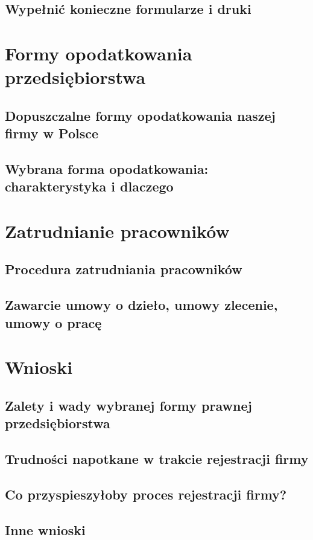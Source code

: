 \documentclass{sprawozdanie-agh}
\begin{document}
		\subsection{Wypełnić konieczne formularze i druki}

	\section{Formy opodatkowania przedsiębiorstwa}

		\subsection{Dopuszczalne formy opodatkowania naszej firmy w Polsce}
		\subsection{Wybrana forma opodatkowania: charakterystyka i dlaczego}

	\section{Zatrudnianie pracowników}

		\subsection{Procedura zatrudniania pracowników}
		\subsection{Zawarcie umowy o dzieło, umowy zlecenie, umowy o pracę}

	\section{Wnioski} 

		\subsection{Zalety i wady wybranej formy prawnej przedsiębiorstwa}
		\subsection{Trudności napotkane w trakcie rejestracji firmy}
		\subsection{Co przyspieszyłoby proces rejestracji firmy?}
		\subsection{Inne wnioski}
\end{document}
